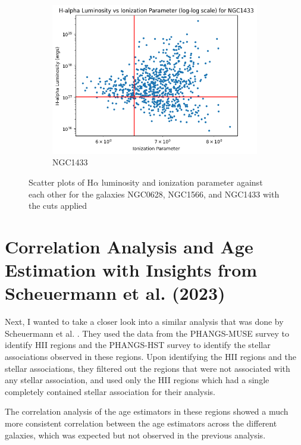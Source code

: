 \documentclass[12pt]{report}
\begin{document}
\begin{figure}[htbp]
\begin{subfigure}{0.3\textwidth}
        \includegraphics[width=\linewidth]{image15.png}
        \caption{NGC1433}
        \label{fig:image15}
    \end{subfigure}

    \small
    \caption{Scatter plots of H$\alpha$ luminosity and ionization parameter against each other for the galaxies NGC0628, NGC1566, and NGC1433 with the cuts applied}
    \label{fig:grid_of_images_with_cuts}

\end{figure}

\section{Correlation Analysis and Age Estimation with Insights from Scheuermann et al. (2023)}

Next, I wanted to take a closer look into a similar analysis that was done by Scheuermann et al. \cite{scheuermann2023stellar}. They used the data from the PHANGS-MUSE survey to identify HII regions and the PHANGS-HST survey to identify the stellar associations observed in these regions. Upon identifying the HII regions and the stellar associations, they filtered out the regions that were not associated with any stellar association, and used only the HII regions which had a single completely contained stellar association for their analysis. 

The correlation analysis of the age estimators in these regions showed a much more consistent correlation between the age estimators across the different galaxies, which was expected but not observed in the previous analysis. 
\end{document}

